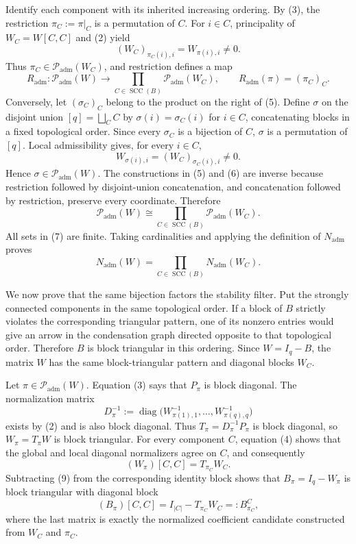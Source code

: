 Identify each component with its inherited increasing ordering. By (3), the restriction \(\pi_C:=\pi|_C\) is a permutation of \(C\). For \(i\in C\), principality of \(W_C=W[C,C]\) and (2) yield
\[
 (W_C)_{\pi_C(i),i}=W_{\pi(i),i}\neq0. \tag{4}
\]
Thus \(\pi_C\in\mathcal P_{\mathrm{adm}}(W_C)\), and restriction defines a map
\[
 R_{\mathrm{adm}}:\mathcal P_{\mathrm{adm}}(W)
 \longrightarrow
 \prod_{C\in\operatorname{SCC}(B)}\mathcal P_{\mathrm{adm}}(W_C),
 \qquad
 R_{\mathrm{adm}}(\pi)=(\pi_C)_C. \tag{5}
\]
Conversely, let \((\sigma_C)_C\) belong to the product on the right of (5). Define \(\sigma\) on the disjoint union \([q]=\bigsqcup_C C\) by \(\sigma(i)=\sigma_C(i)\) for \(i\in C\), concatenating blocks in a fixed topological order. Since every \(\sigma_C\) is a bijection of \(C\), \(\sigma\) is a permutation of \([q]\). Local admissibility gives, for every \(i\in C\),
\[
 W_{\sigma(i),i}=(W_C)_{\sigma_C(i),i}\neq0. \tag{6}
\]
Hence \(\sigma\in\mathcal P_{\mathrm{adm}}(W)\). The constructions in (5) and (6) are inverse because restriction followed by disjoint-union concatenation, and concatenation followed by restriction, preserve every coordinate. Therefore
\[
 \mathcal P_{\mathrm{adm}}(W)
 \cong
 \prod_{C\in\operatorname{SCC}(B)}\mathcal P_{\mathrm{adm}}(W_C). \tag{7}
\]
All sets in (7) are finite. Taking cardinalities and applying the definition of \(N_{\mathrm{adm}}\) proves
\[
 N_{\mathrm{adm}}(W)
 =\prod_{C\in\operatorname{SCC}(B)}N_{\mathrm{adm}}(W_C). \tag{8}
\]

We now prove that the same bijection factors the stability filter. Put the strongly connected components in the same topological order. If a block of \(B\) strictly violates the corresponding triangular pattern, one of its nonzero entries would give an arrow in the condensation graph directed opposite to that topological order. Therefore \(B\) is block triangular in this ordering. Since \(W=I_q-B\), the matrix \(W\) has the same block-triangular pattern and diagonal blocks \(W_C\).

Let \(\pi\in\mathcal P_{\mathrm{adm}}(W)\). Equation (3) says that \(P_\pi\) is block diagonal. The normalization matrix
\[
 D_\pi^{-1}:=\operatorname{diag}\bigl(W_{\pi(1),1}^{-1},\ldots,W_{\pi(q),q}^{-1}\bigr)
\]
exists by (2) and is also block diagonal. Thus \(T_\pi=D_\pi^{-1}P_\pi\) is block diagonal, so \(W_\pi=T_\pi W\) is block triangular. For every component \(C\), equation (4) shows that the global and local diagonal normalizers agree on \(C\), and consequently
\[
 (W_\pi)[C,C]
 =T_{\pi_C}W_C. \tag{9}
\]
Subtracting (9) from the corresponding identity block shows that \(B_\pi=I_q-W_\pi\) is block triangular with diagonal block
\[
 (B_\pi)[C,C]
 =I_{|C|}-T_{\pi_C}W_C
 =:B^C_{\pi_C}, \tag{10}
\]
where the last matrix is exactly the normalized coefficient candidate constructed from \(W_C\) and \(\pi_C\).

